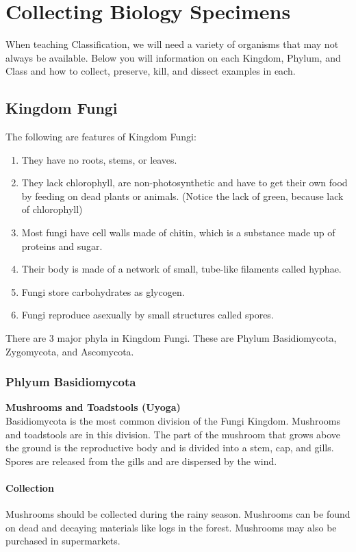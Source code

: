 \chapter{Collecting Biology Specimens}

When teaching Classification, we will need a variety of organisms that may not always be available. Below you will information on each Kingdom, Phylum, and Class and how to collect, preserve, kill, and dissect examples in each.

\section{Kingdom Fungi}
The following are features of Kingdom Fungi:
\begin{enumerate}
\item{They have no roots, stems, or leaves.}
\item{They lack chlorophyll, are non-photosynthetic and have to get their own food by feeding on dead plants or animals. (Notice the lack of green, because lack of chlorophyll)}
\item{Most fungi have cell walls made of chitin, which is a substance made up of proteins and sugar.}
\item{Their body is made of a network of small, tube-like filaments called hyphae.}
\item{Fungi store carbohydrates as glycogen.}
\item{Fungi reproduce asexually by small structures called spores.} 
\end{enumerate}

There are 3 major phyla in Kingdom Fungi. These are Phylum Basidiomycota, Zygomycota, and Ascomycota.
\subsection{Phlyum Basidiomycota}

\textbf{Mushrooms and Toadstools (Uyoga)}\\
Basidiomycota is the most common division of the Fungi Kingdom. Mushrooms and toadstools are in this division. The part of the mushroom that grows above the ground is the reproductive body and is divided into a stem, cap, and gills. Spores are released from the gills and are dispersed by the wind.

\subsubsection{Collection}
Mushrooms should be collected during the rainy season. Mushrooms can be found on dead and decaying materials like logs in the forest. Mushrooms may also be purchased in supermarkets.

